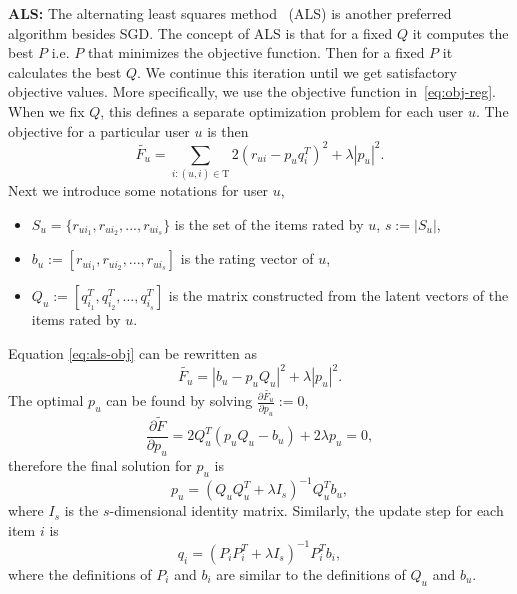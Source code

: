 \documentclass[10pt]{article}
\newenvironment{myitemize}{\begin{itemize} \setlength{\topsep}{0pt} \setlength{\itemsep}{0pt} \setlength{\parskip}{0pt} \setlength{\parsep}{0pt}}{  \end{itemize} }
\begin{document}
\textbf{ALS:}  
The alternating least squares method~\cite{pilaszy2010fast,koren2009matrix} (ALS) is another preferred algorithm besides SGD. 
The concept of ALS is that for a fixed $Q$ it computes the best $P$ i.e. $P$ that minimizes the objective function.
Then for a fixed $P$ it calculates the best $Q$.
We continue this iteration until we get satisfactory objective values.
More specifically, we use the objective function in~\eqref{eq:obj-reg}.
When we fix $Q$, this defines a separate optimization problem for each user $u$.
The objective for a particular user $u$ is then
\begin{equation}
	\tilde{F_u} = \displaystyle\sum_{i:(u,i) \in \text{T}} 2 \left (r_{ui} - p_u q_i^T \right ) ^ 2 + \lambda |p_u|^2.
	\label{eq:als-obj}
\end{equation}
Next we introduce some notations for user $u$,
\begin{myitemize}
	\item $S_u = \{r_{ui_1}, r_{ui_2}, ..., r_{ui_s}\}$ is the set of the items rated by $u$, $s:=|S_u|$,
	\item $b_u:=\left [ r_{ui_1}, r_{ui_2}, ..., r_{ui_s} \right ]$ is the rating vector of $u$,
	\item $Q_u:=\left [ q_{i_1}^T, q_{i_2}^T, ..., q_{i_s}^T \right ]$ is the matrix constructed from the latent vectors of the items rated by $u$.
\end{myitemize}
Equation \eqref{eq:als-obj} can be rewritten as
\begin{equation}
	\tilde{F_u} = | b_u - p_u Q_u | ^ 2 + \lambda |p_u|^2.
\end{equation}
The optimal $p_u$ can be found by solving $\frac{\partial\tilde{F_u}}{\partial p_u}:=0$,
\begin{equation}
	\frac{\partial\tilde{F}}{\partial p_u} = 2 Q_u^T(p_u Q_u - b_u )+ 2 \lambda p_u = 0,
\end{equation}
therefore the final solution for $p_u$ is
\begin{equation}
	p_u = (Q_u Q_u^T + \lambda I_s)^{-1} Q_u^T b_u,
\end{equation}
where $I_s$ is the $s$-dimensional identity matrix.
Similarly, the update step for each item $i$ is
\begin{equation}
	q_i = (P_i P_i^T + \lambda I_s)^{-1} P_i^T b_i,
\end{equation}
where the definitions of $P_i$ and $b_i$ are similar to the definitions of $Q_u$ and $b_u$.  
\end{document}

